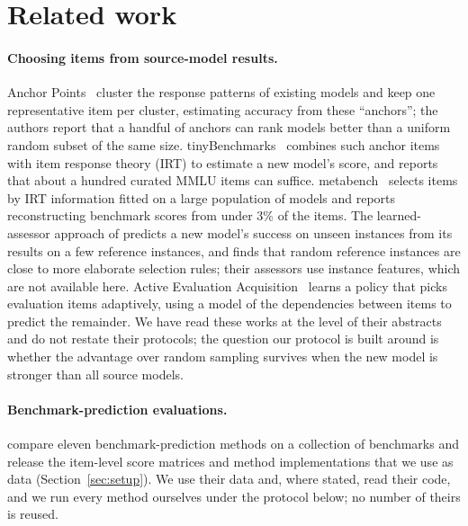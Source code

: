 \section{Related work}
\label{sec:related}

\paragraph{Choosing items from source-model results.}
Anchor Points~\citep{vivek2024anchor} cluster the response patterns of existing models and keep one representative item per cluster, estimating accuracy from these ``anchors''; the authors report that a handful of anchors can rank models better than a uniform random subset of the same size. tinyBenchmarks~\citep{mauricio2024tiny} combines such anchor items with item response theory (IRT) to estimate a new model's score, and reports that about a hundred curated MMLU items can suffice. metabench~\citep{kipnis2025metabench} selects items by IRT information fitted on a large population of models and reports reconstructing benchmark scores from under 3\% of the items. The learned-assessor approach of \citet{pacchiardi2024100} predicts a new model's success on unseen instances from its results on a few reference instances, and finds that random reference instances are close to more elaborate selection rules; their assessors use instance features, which are not available here. Active Evaluation Acquisition~\citep{li2025active} learns a policy that picks evaluation items adaptively, using a model of the dependencies between items to predict the remainder. We have read these works at the level of their abstracts and do not restate their protocols; the question our protocol is built around is whether the advantage over random sampling survives when the new model is stronger than all source models.

\paragraph{Benchmark-prediction evaluations.}
\citet{zhang2025benchmark} compare eleven benchmark-prediction methods on a collection of benchmarks and release the item-level score matrices and method implementations that we use as data (Section~\ref{sec:setup}). We use their data and, where stated, read their code, and we run every method ourselves under the protocol below; no number of theirs is reused.

